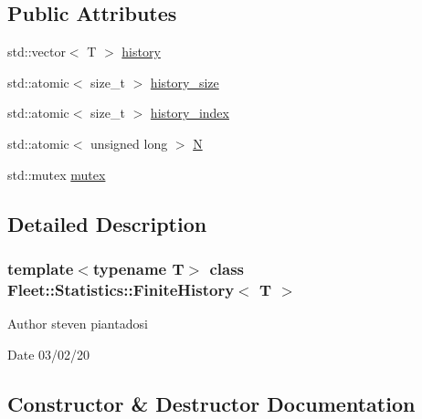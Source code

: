 \subsection*{Public Attributes}
\begin{DoxyCompactItemize}
\item 
std\+::vector$<$ T $>$ \hyperlink{class_fleet_1_1_statistics_1_1_finite_history_a567aa8bf1cbbb762b82b6910e5cd92cd}{history}
\item 
std\+::atomic$<$ size\+\_\+t $>$ \hyperlink{class_fleet_1_1_statistics_1_1_finite_history_a5ed75416ad7a32def48ee647918e5734}{history\+\_\+size}
\item 
std\+::atomic$<$ size\+\_\+t $>$ \hyperlink{class_fleet_1_1_statistics_1_1_finite_history_a05063bf9616d2b49fc35f10a2d071552}{history\+\_\+index}
\item 
std\+::atomic$<$ unsigned long $>$ \hyperlink{class_fleet_1_1_statistics_1_1_finite_history_a67d34a239140f65d8ca07de2a10c45c9}{N}
\item 
std\+::mutex \hyperlink{class_fleet_1_1_statistics_1_1_finite_history_abae96d2bf212abbf0bcfb74ac41b7165}{mutex}
\end{DoxyCompactItemize}


\subsection{Detailed Description}
\subsubsection*{template$<$typename T$>$\newline
class Fleet\+::\+Statistics\+::\+Finite\+History$<$ T $>$}

\begin{DoxyAuthor}{Author}
steven piantadosi 
\end{DoxyAuthor}
\begin{DoxyDate}{Date}
03/02/20 
\end{DoxyDate}


\subsection{Constructor \& Destructor Documentation}
\mbox{\label{class_fleet_1_1_statistics_1_1_finite_history_a14ef23d9161c620fa8dce3c42ce08220}} 
